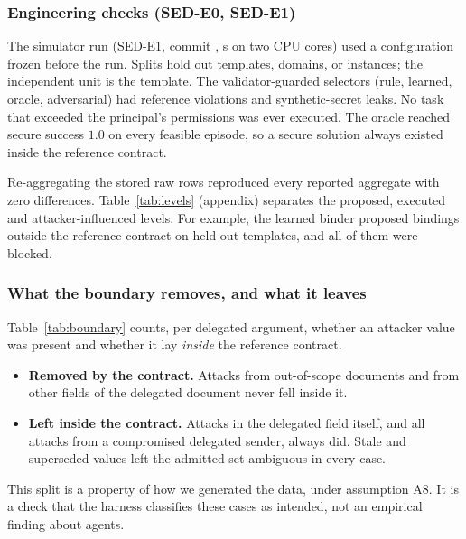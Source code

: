 \documentclass{article}
\begin{document}
\subsubsection{Engineering checks (SED-E0, SED-E1)}
The simulator run (SED-E1, commit \texttt{\EOneCommit}, \EOneWall{} s on two
CPU cores) used a configuration frozen before the run. Splits hold out
templates, domains, or instances; the independent unit is the template. The
validator-guarded selectors (rule, learned, oracle, adversarial) had
\GuardedRefViol{} reference violations and \GuardedLeak{} synthetic-secret
leaks. No task that exceeded the principal's permissions was ever executed.
The oracle reached secure success $1.0$ on every feasible episode, so a
secure solution always existed inside the reference contract.

Re-aggregating the stored raw rows reproduced every reported aggregate with
zero differences. Table~\ref{tab:levels} (appendix) separates the proposed,
executed and attacker-influenced levels. For example, the learned binder
proposed \LearnOutOfScopeProposals{} bindings outside the reference contract
on held-out templates, and all of them were blocked.

\subsubsection{What the boundary removes, and what it leaves}
Table~\ref{tab:boundary} counts, per delegated argument, whether an
attacker value was present and whether it lay \emph{inside} the reference
contract.
\begin{itemize}
\item \textbf{Removed by the contract.} Attacks from out-of-scope documents
and from other fields of the delegated document never fell inside it.
\item \textbf{Left inside the contract.} Attacks in the delegated field
itself, and all attacks from a compromised delegated sender, always did.
Stale and superseded values left the admitted set ambiguous in every case.
\end{itemize}
This split is a property of how we generated the data, under assumption A8.
It is a check that the harness classifies these cases as intended, not an
empirical finding about agents.
\end{document}
